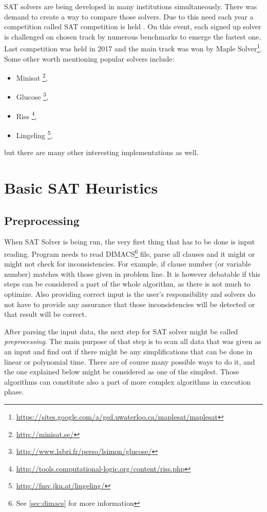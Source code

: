\documentclass[12pt,english,pdflatex]{aghdpl}
\begin{document}
SAT solvers are being developed in many institutions simultaneously.
There was demand to create a way to compare those solvers. Due to
this need each year a competition  called SAT competition is held \cite{Satcomp}.
On this event, each signed up solver is challenged on chosen track
by numerous benchmarks to emerge the fastest one. Last competition
was held in 2017 and the main track was won by Maple Solver\footnote{\url{https://sites.google.com/a/gsd.uwaterloo.ca/maplesat/maplesat}}. Some other worth mentioning popular solvers include:
\begin{itemize}
\item Minisat \footnote{\url{http://minisat.se/}},
\item Glucose \footnote{\url{http://www.labri.fr/perso/lsimon/glucose/}},
\item Riss \footnote{\url{http://tools.computational-logic.org/content/riss.php}},
\item Lingeling \footnote{\url{http://fmv.jku.at/lingeling/}},
\end{itemize}
but there are many other interesting implementations as well.



\chapter{Basic SAT Heuristics}
\label{chap:Heuristics}

\section{Preprocessing}
\label{sec:Preprocessing}

When SAT Solver is being run, the very first thing that has to be
done is input reading. Program needs to read DIMACS\footnote{See \ref{sec:dimacs} for more information} file, parse all
clauses and it might or might not check for inconsistencies. For example,
if clause number (or variable number) matches with those given in
problem line. It is however debatable if this steps can be considered
a part of the whole algorithm, as there is not much to optimize. Also
providing correct input is the user's responsibility and solvers do not
have to provide any assurance that those inconsistencies will be detected
or that result will be correct. 

After parsing  the input data, the next step for SAT solver might be called
\textit{preprocessing}. The main  purpose of that step is to scan all data that
was given as an input and find out if there might be any simplifications
that can be done in linear or polynomial time. There are of course many possible ways to do it,
and the one explained below might be considered as one of the simplest.
Those algorithms can constitute  also a part of more complex algorithms in execution
phase.
\end{document}
